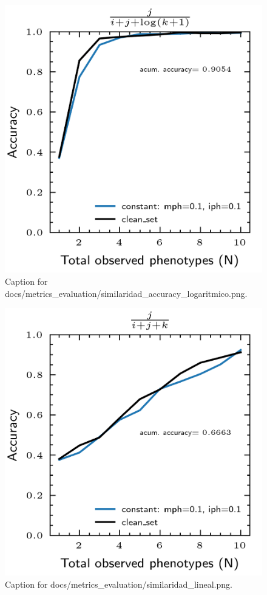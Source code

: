\documentclass{article}
\begin{document}
\begin{figure}[h] \centering \includegraphics{docs/metrics_evaluation/similaridad_accuracy_logaritmico.png} \caption{Caption for docs/metrics_evaluation/similaridad_accuracy_logaritmico.png.} \end{figure}
\begin{figure}[h] \centering \includegraphics{docs/metrics_evaluation/similaridad_lineal.png} \caption{Caption for docs/metrics_evaluation/similaridad_lineal.png.} \end{figure}
\end{document}
